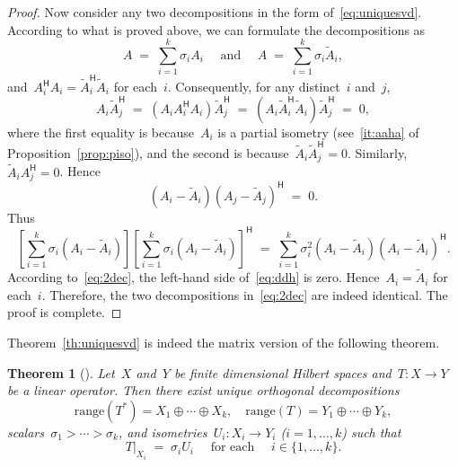 \documentclass[11pt,a4paper]{article}
\newtheorem{theorem}{Theorem}%
\theoremstyle{definition}
\newcommand{\hmt}{{\scriptscriptstyle{{\mathsf{H}}}}}
\newcommand{\range}{\mathrm{range}}
\begin{document}
\begin{proof}
  Now consider any two decompositions in the form of~\eqref{eq:uniquesvd}. According to what is
  proved above, we can formulate the decompositions as 
  \begin{equation}
    \label{eq:2dec}
    A \;=\; \sum_{i=1}^k \sigma_i A_i \quad \text{ and } \quad 
    A\;=\;\sum_{i=1}^k \sigma_i \tilde{A}_i, 
  \end{equation}
  and~$A_i^\hmt A_i= \tilde{A}_i^\hmt\tilde{A}_i$ for each~$i$.
  Consequently, for any distinct~$i$ and~$j$, 
  \begin{equation*}
    A_i\tilde{A}_j^\hmt \;=\; (A_iA_i^\hmt A_i)\tilde{A}_j^\hmt 
    \;=\; (A_i\tilde{A}_i^\hmt \tilde{A}_i)\tilde{A}_j^\hmt \;=\; 0,
  \end{equation*}
  where the first equality is because~$A_i$ is a partial isometry (see~\ref{it:aaha} of
  Proposition~\ref{prop:piso}), and the second is because~$\tilde{A}_i\tilde{A}_j^\hmt = 0$.  
  Similarly, $\tilde{A}_iA_j^\hmt = 0$. Hence
  \begin{equation*}
    (A_i-\tilde{A}_i)(A_j-\tilde{A}_j)^\hmt \;=\; 0.
  \end{equation*}
  Thus
  \begin{equation}
    \label{eq:ddh}
    \left[\sum_{i=1}^k \sigma_i(A_i-\tilde{A}_i) \right]
    \left[\sum_{i=1}^k \sigma_i(A_i-\tilde{A}_i) \right]^\hmt
    \;=\; \sum_{i=1}^k \sigma_i^2 (A_i-\tilde{A}_i)(A_i-\tilde{A}_i)^\hmt.
  \end{equation}
  According to~\eqref{eq:2dec}, the left-hand side of~\eqref{eq:ddh} is zero.
  Hence~$A_i=\tilde{A}_i$ for each~$i$. Therefore, the two decompositions in~\eqref{eq:2dec} are
  indeed identical. The proof is complete. 
\end{proof}

Theorem~\ref{th:uniquesvd} is indeed the matrix version of the following theorem. 

\begin{theorem}[{\cite[Theorem~1]{Koranyi_2001}}]\label{th:orthodec}
  Let~$X$ and~$Y$ be finite dimensional Hilbert spaces and~$T\mathrel{:}X\to Y$ be a linear
  operator. Then there exist unique orthogonal decompositions
  \begin{equation*}
    \range(T^*) = X_1 \oplus \cdots \oplus X_k, \quad 
    \range(T) = Y_1 \oplus \cdots \oplus Y_k,
  \end{equation*}
  scalars~$\sigma_1>\cdots >\sigma_k$, and isometries~$U_i\mathrel{:}X_i\to Y_i$ \textnormal{(}$i=1,
  \dots, k$\textnormal{)}
  such that 
  \begin{equation*}
    T|_{X_i} \;=\; \sigma_i U_i
    \quad \text{ for each }\quad i\in\{1,\dots,k\}.
  \end{equation*}
\end{theorem}
\end{document}

